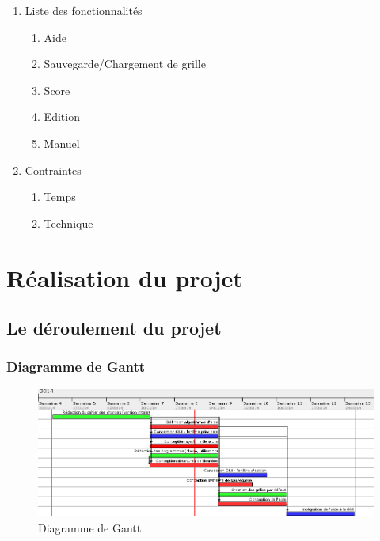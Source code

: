 \documentclass[12pt]{beamer}
\begin{document}
   \begin{frame}
   \begin{enumerate}
   \item Liste des fonctionnalités
    
    \begin{enumerate}
                        
        \item Aide\pause
                        
        \item Sauvegarde/Chargement de grille\pause
                        
        \item Score\pause
                        
        \item Edition\pause
                        
        \item Manuel\pause
    \end{enumerate}
    
    
    \pause
    \item Contraintes 
    \begin{enumerate}
        \item Temps
        \item Technique
    \end{enumerate}
    
    
    \end{enumerate}
\end{frame}


\section{Réalisation du projet}
\subsection{Le déroulement du projet}


\begin{frame}
  \frametitle{Diagramme de Gantt}
  \begin{figure}[t]
    \centering
    \includegraphics[scale=0.38]{data/ganttDiagram}
    \caption{Diagramme de Gantt}
  \end{figure}
\end{frame}
\end{document}
